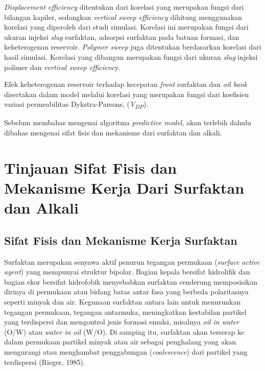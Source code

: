 \documentclass[
]{book}
\begin{document}
\emph{Displacement efficiency} ditentukan dari korelasi yang merupakan fungsi dari bilangan kapiler, sedangkan \emph{vertical sweep efficiency} dihitung menggunakan korelasi yang diperoleh dari studi simulasi. Korelasi ini merupakan fungsi dari ukuran injeksi \emph{slug} surfaktan, adsorpsi surfaktan pada batuan formasi, dan keheterogenan reservoir. \emph{Polymer sweep} juga ditentukan berdasarkan korelasi dari hasil simulasi. Korelasi yang dibangun merupakan fungsi dari ukuran \emph{slug} injeksi polimer dan \emph{vertical sweep efficienc}y.

Efek keheterogenan reservoir terhadap kecepatan \emph{front} surfaktan dan \emph{oil bank} disertakan dalam model melalui korelasi yang merupakan fungsi dari koefisien variasi permeabilitas Dykstra-Parsons, (\emph{V\textsubscript{DP}}).

Sebelum membahas mengenai algoritma \emph{predictive model}, akan terlebih dahulu dibahas mengenai sifat fisis dan mekanisme dari surfaktan dan alkali.

\hypertarget{tinjauan-sifat-fisis-dan-mekanisme-kerja-dari-surfaktan-dan-alkali}{%
\section{Tinjauan Sifat Fisis dan Mekanisme Kerja Dari Surfaktan dan Alkali}\label{tinjauan-sifat-fisis-dan-mekanisme-kerja-dari-surfaktan-dan-alkali}}

\hypertarget{sifat-fisis-dan-mekanisme-kerja-surfaktan}{%
\subsection{Sifat Fisis dan Mekanisme Kerja Surfaktan}\label{sifat-fisis-dan-mekanisme-kerja-surfaktan}}

Surfaktan merupakan senyawa aktif penurun tegangan permukaan (\emph{surface active agent}) yang mempunyai struktur bipolar. Bagian kepala bersifat hidrolifik dan bagian ekor bersifat hidrofobik menyebabkan surfaktan cenderung memposisikan dirinya di permukaan atau bidang batas antar fasa yang berbeda polaritasnya seperti minyak dan air. Kegunaan surfaktan antara lain untuk menurunkan tegangan permukaan, tegangan antarmuka, meningkatkan kestabilan partikel yang terdispersi dan mengontrol jenis formasi emulsi, misalnya \emph{oil in water} (O/W) atau \emph{water in oil} (W/O). Di samping itu, surfaktan akan terserap ke dalam permukaan partikel minyak atau air sebagai penghalang yang akan mengurangi atau menghambat penggabungan (\emph{coalescence}) dari partikel yang terdispersi (Rieger, 1985).
\end{document}

